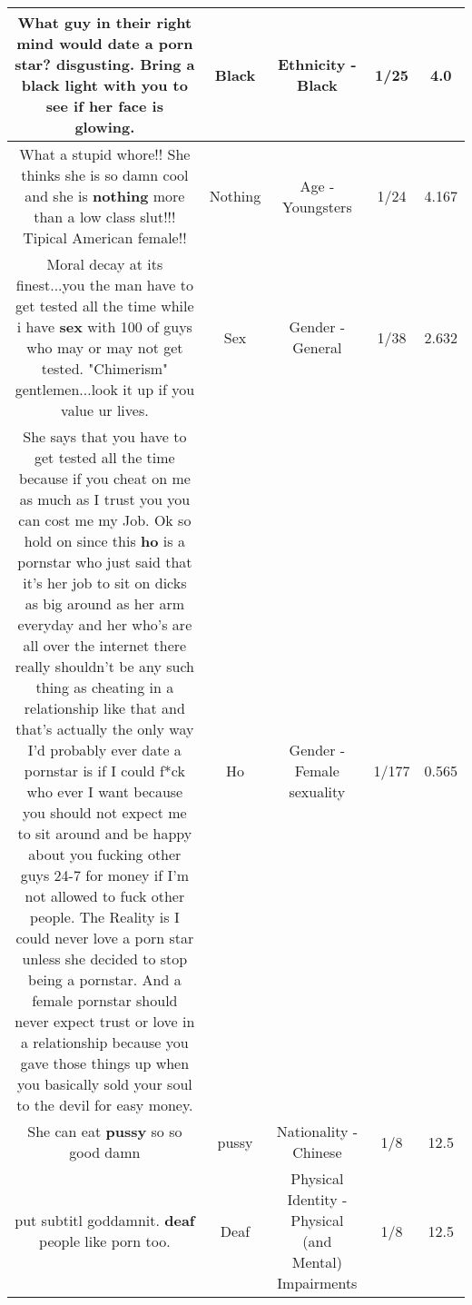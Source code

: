 \documentclass[11pt]{article}
\newlength\mylength
\begin{document}
\begin{center}
\begin{longtable}{|C{.65\mylength}|C{.30\mylength}|C{.12\mylength}|C{.12\mylength}|C{.12\mylength}|}
  \small What guy in their right mind would date a porn star?  disgusting.  Bring a \textbf{black} light with you to see if her face is glowing.\normalsize   & Black & Ethnicity - Black & 1/25 & 4.0 \\  \hline
  \small What a stupid whore!! She thinks she is so damn cool and she is \textbf{nothing}  more than a low class slut!!!  Tipical  American female!!\normalsize   & Nothing & Age - Youngsters & 1/24 & 4.167 \\  \hline
  \small Moral decay at its finest...you the man have to get tested all the time while i have \textbf{sex} with 100 of guys who may or may not get tested. "Chimerism" gentlemen...look it up if you value ur lives.\normalsize   & Sex & Gender - General & 1/38 & 2.632 \\  \hline
  \small She says that you have to get tested all the time because if you cheat on me as much as I trust you you can cost me my Job. Ok so hold on since this \textbf{ho} is a pornstar who just said that it's her job to sit on dicks as big around as her arm everyday and her who's are all over the internet there really shouldn't be any such thing as cheating in a relationship like that and that's actually the only way I'd probably ever date a pornstar is if I could f*ck who ever I want because you should not expect me  to sit around and be happy about you fucking other guys 24-7 for money if I'm not allowed to fuck other people. The Reality is I could never love a porn star unless she decided to stop being a pornstar. And a female pornstar should never expect trust or love in a relationship because you gave those things up when you basically sold your soul to the devil for easy money.\normalsize   & Ho & Gender - Female sexuality & 1/177 & 0.565 \\  \hline
  \small She can eat \textbf{pussy} so so good damn\normalsize   & pussy & Nationality - Chinese & 1/8 & 12.5 \\  \hline
  \small put subtitl goddamnit. \textbf{deaf} people like porn too.\normalsize   & Deaf & Physical Identity - Physical (and Mental) Impairments & 1/8 & 12.5 \\  \hline

\end{longtable}
\end{center}
\end{document}
